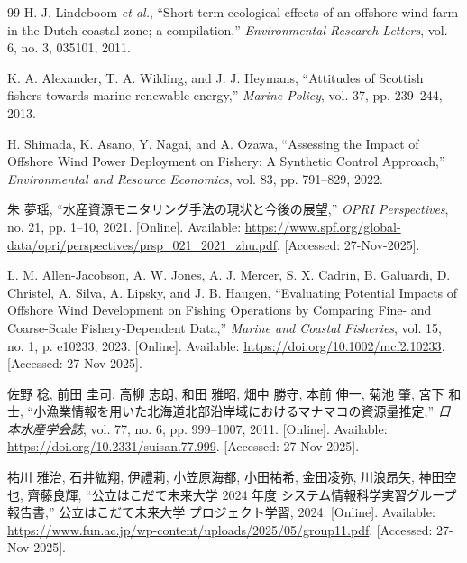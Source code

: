 \begin{thebibliography}{99}
H. J. Lindeboom \textit{et al.}, ``Short-term ecological effects of an offshore wind farm in the Dutch coastal zone; a compilation,'' \textit{Environmental Research Letters}, vol. 6, no. 3, 035101, 2011.

K. A. Alexander, T. A. Wilding, and J. J. Heymans, ``Attitudes of Scottish fishers towards marine renewable energy,'' \textit{Marine Policy}, vol. 37, pp. 239--244, 2013.

H. Shimada, K. Asano, Y. Nagai, and A. Ozawa, ``Assessing the Impact of Offshore Wind Power Deployment on Fishery: A Synthetic Control Approach,'' \textit{Environmental and Resource Economics}, vol. 83, pp. 791--829, 2022.

朱 夢瑶, ``水産資源モニタリング手法の現状と今後の展望,'' \textit{OPRI Perspectives}, no. 21, pp. 1--10, 2021. [Online]. Available: \url{https://www.spf.org/global-data/opri/perspectives/prsp_021_2021_zhu.pdf}. [Accessed: 27-Nov-2025].

L. M. Allen-Jacobson, A. W. Jones, A. J. Mercer, S. X. Cadrin, B. Galuardi, D. Christel, A. Silva, A. Lipsky, and J. B. Haugen, ``Evaluating Potential Impacts of Offshore Wind Development on Fishing Operations by Comparing Fine- and Coarse-Scale Fishery-Dependent Data,'' \textit{Marine and Coastal Fisheries}, vol. 15, no. 1, p. e10233, 2023. [Online]. Available: \url{https://doi.org/10.1002/mcf2.10233}. [Accessed: 27-Nov-2025].

佐野 稔, 前田 圭司, 高柳 志朗, 和田 雅昭, 畑中 勝守, 本前 伸一, 菊池 肇, 宮下 和士, ``小漁業情報を用いた北海道北部沿岸域におけるマナマコの資源量推定,'' \textit{日本水産学会誌}, vol. 77, no. 6, pp. 999--1007, 2011. [Online]. Available: \url{https://doi.org/10.2331/suisan.77.999}. [Accessed: 27-Nov-2025].

祐川 雅治, 石井紘翔, 伊禮莉, 小笠原海都, 小田祐希, 金田凌弥, 川浪昂矢, 神田空也, 齊藤良輝, ``公立はこだて未来大学 2024 年度 システム情報科学実習グループ報告書,'' 公立はこだて未来大学 プロジェクト学習, 2024. [Online]. Available: \url{https://www.fun.ac.jp/wp-content/uploads/2025/05/group11.pdf}. [Accessed: 27-Nov-2025].


\end{thebibliography}
